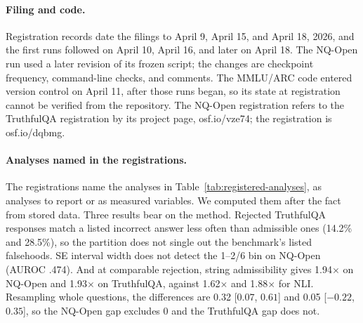 \paragraph{Filing and code.} Registration records date the filings to April 9, April 15, and April 18, 2026, and the first runs followed on April 10, April 16, and later on April 18. The NQ-Open run used a later revision of its frozen script; the changes are checkpoint frequency, command-line checks, and comments. The MMLU/ARC code entered version control on April 11, after those runs began, so its state at registration cannot be verified from the repository. The NQ-Open registration refers to the TruthfulQA registration by its project page, osf.io/vze74; the registration is osf.io/dqbmg.

\paragraph{Analyses named in the registrations.} The registrations name the analyses in Table~\ref{tab:registered-analyses}, as analyses to report or as measured variables. We computed them after the fact from stored data. Three results bear on the method. Rejected TruthfulQA responses match a listed incorrect answer less often than admissible ones (14.2\% and 28.5\%), so the partition does not single out the benchmark's listed falsehoods. SE interval width does not detect the 1--2/6 bin on NQ-Open (AUROC .474). And at comparable rejection, string admissibility gives 1.94$\times$ on NQ-Open and 1.93$\times$ on TruthfulQA, against 1.62$\times$ and 1.88$\times$ for NLI. Resampling whole questions, the differences are 0.32 [$0.07$, $0.61$] and 0.05 [$-0.22$, $0.35$], so the NQ-Open gap excludes 0 and the TruthfulQA gap does not.
